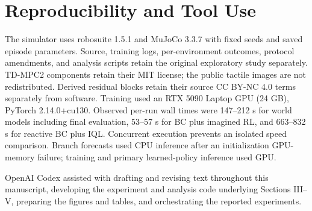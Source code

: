 \documentclass[letterpaper,10pt,conference]{ieeeconf}
\begin{document}
\section*{Reproducibility and Tool Use}
The simulator uses robosuite 1.5.1 and MuJoCo 3.3.7 with fixed seeds and saved
episode parameters. Source, training logs, per-environment outcomes,
protocol amendments, and analysis scripts retain the original exploratory
study separately. TD-MPC2 components retain their MIT license; the
public tactile images are not redistributed. Derived residual blocks retain
their source CC BY-NC 4.0 terms separately from software. Training used an RTX 5090 Laptop GPU (24 GB), PyTorch 2.14.0+cu130. Observed per-run wall times were 147--212 s for world models including final evaluation, 53--57 s for BC plus imagined RL, and 663--832 s for reactive BC plus IQL. Concurrent execution prevents an isolated speed comparison. Branch forecasts used CPU inference after an initialization GPU-memory failure; training and primary learned-policy inference used GPU.

OpenAI Codex assisted with drafting and revising text throughout this
manuscript, developing the experiment and analysis code underlying
Sections III--V, preparing the figures and tables, and orchestrating
the reported experiments.
\end{document}
